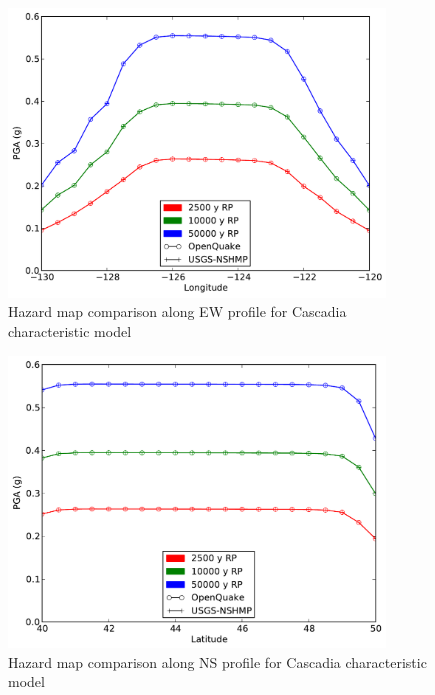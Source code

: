 \begin{figure}
\centering
\includegraphics[width=10cm]{./qareport/pictures/cascadia_char_oq_nshmp_ew.pdf}
\caption{Hazard map comparison along EW profile for Cascadia characteristic model}
\label{fig:cascadia_char_ew}
\end{figure}
\begin{figure}
\centering
\includegraphics[width=10cm]{./qareport/pictures/cascadia_char_oq_nshmp_ns.pdf}
\caption{Hazard map comparison along NS profile for Cascadia characteristic model}
\label{fig:cascadia_char_ns}
\end{figure}

